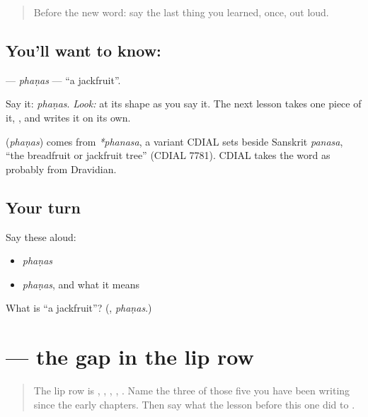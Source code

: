 \label{lesson:MR-C64-phanas}



\begin{quote}
Before the new word: say the last thing you learned, once, out loud.
\end{quote}

\subsection*{You'll want to know: }
\textbf{} — \emph{phaṇas} — \textquotedblleft{}a jackfruit\textquotedblright{}.

Say it: \emph{phaṇas}. \emph{Look:} at its shape as you say it. The next lesson takes one piece of it, \textbf{}, and writes it on its own.

\begin{cousinweb}
\textbf{} (\emph{phaṇas}) comes from \emph{*phanasa}, a variant CDIAL sets beside Sanskrit \emph{panasa}, \textquotedblleft{}the breadfruit or jackfruit tree\textquotedblright{} (CDIAL 7781). CDIAL takes the word as probably from Dravidian.
\end{cousinweb}

\subsection*{Your turn}
Say these aloud:

\begin{itemize}
\raggedright
  \item \emph{phaṇas}
  \item \emph{phaṇas}, and what it means
\end{itemize}

\begin{tcolorbox}[breakable,colback=teal!4,colframe=teal!35!black,title={Before you move on}]
What is \textquotedblleft{}a jackfruit\textquotedblright{}? (\textbf{}, \emph{phaṇas}.)
\end{tcolorbox}
\section[\texorpdfstring{\mr{फ} (pha)}{फ (pha)}]{ — the gap in the lip row}

\label{lesson:MR-W64-pha}



\begin{quote}
The lip row is \textbf{}, \textbf{}, \textbf{}, \textbf{}, \textbf{}. Name the three of those five you have been writing since the early chapters. Then say what the lesson before this one did to \textbf{}.
\end{quote}


